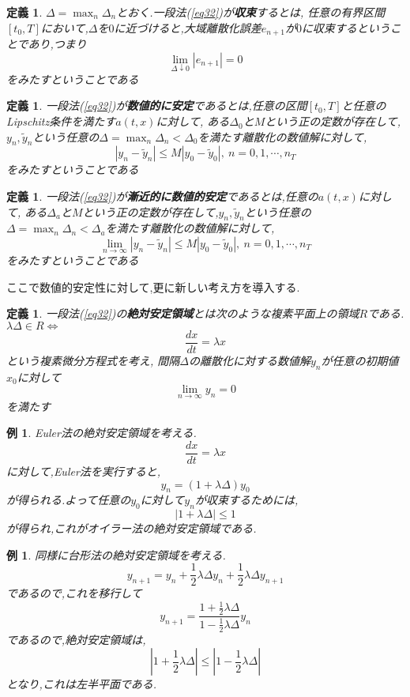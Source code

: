 \documentclass[a4paper]{jreport}
\numberwithin{equation}{section}
\newtheorem{Def}     [Thm]{定義}
\newtheorem{Ex}      [Thm]{例}
\renewenvironment{leftbar}{%
  \def\FrameCommand{\vrule width 1pt \hspace{10pt}}%
  \MakeFramed {\advance\hsize-\width \FrameRestore}}%
 {\endMakeFramed}
\def\iff{\Leftrightarrow}
\def\defb{\begin{leftbar}\begin{Def}}
\def\defx{\end{Def}\end{leftbar}}
\def\ex{\begin{Ex}}
\def\exx{\end{Ex}}
\begin{document}
\defb
$\Delta =\max_n \Delta_n$とおく.一段法(\ref{eq32})が{\bf 収束}するとは,
任意の有界区間$[t_0,T]$において,$\Delta$を$0$に近づけると,大域離散化誤差$e_{n+1}$が$0$に収束するということであり,つまり\\
\[
\lim_{\Delta \downarrow 0} |e_{n+1}| = 0
\]
をみたすということである
\defx

\defb
一段法(\ref{eq32})が{\bf 数値的に安定}であるとは,任意の区間$[t_0,T]$と任意のLipschitz条件を満たす$a(t,x)$に対して,
ある$\Delta_0$と$M$という正の定数が存在して,$y_n,\tilde{y}_n$という任意の$\Delta =\max_n \Delta_n < \Delta_0$を満たす離散化の数値解に対して,
\[
|y_n - \tilde{y}_n | \le M |y_0 - \tilde{y}_0| ,\ n = 0,1,\cdots,n_T
\]
をみたすということである
\defx

\defb
一段法(\ref{eq32})が{\bf 漸近的に数値的安定}であるとは,任意の$a(t,x)$に対して,
ある$\Delta_a$と$M$という正の定数が存在して,$y_n,\tilde{y}_n$という任意の$\Delta =\max_n \Delta_n < \Delta_a$を満たす離散化の数値解に対して,
\[
\lim_{n\to\infty}|y_n - \tilde{y}_n | \le M |y_0 - \tilde{y}_0| ,\ n = 0,1,\cdots,n_T
\]
をみたすということである
\defx

ここで数値的安定性に対して,更に新しい考え方を導入する.
\defb
一段法(\ref{eq32})の{\bf 絶対安定領域}とは次のような複素平面上の領域$R$である.
\\
$\lambda \Delta \in R \iff $
\[
\frac{dx}{dt} = \lambda x
\]
という複素微分方程式を考え,
間隔$\Delta$の離散化に対する数値解$y_n$が任意の初期値$x_0$に対して
\[
\lim_{n\to\infty} y_n = 0
\]
を満たす
\defx
\ex
Euler法の絶対安定領域を考える.\\
\[
\frac{dx}{dt} = \lambda x
\]
に対して,Euler法を実行すると,\\
\[
y_n = (1+\lambda\Delta)y_0
\]
が得られる.よって任意の$y_0$に対して$y_n$が収束するためには,
\[
|1+\lambda\Delta| \le 1
\]
が得られ,これがオイラー法の絶対安定領域である.
\exx
\ex
同様に台形法の絶対安定領域を考える.\\
\[
y_{n+1} = y_n + \frac{1}{2} \lambda \Delta y_n +  \frac{1}{2} \lambda \Delta y_{n+1}
\]
であるので,これを移行して
\[
y_{n+1} = \frac{1+ \frac{1}{2} \lambda \Delta}{1- \frac{1}{2} \lambda \Delta}y_n
\]
であるので,絶対安定領域は,
\[
|1+ \frac{1}{2} \lambda \Delta| \le |1- \frac{1}{2} \lambda\Delta |
\]
となり,これは左半平面である.
\exx
\end{document}
